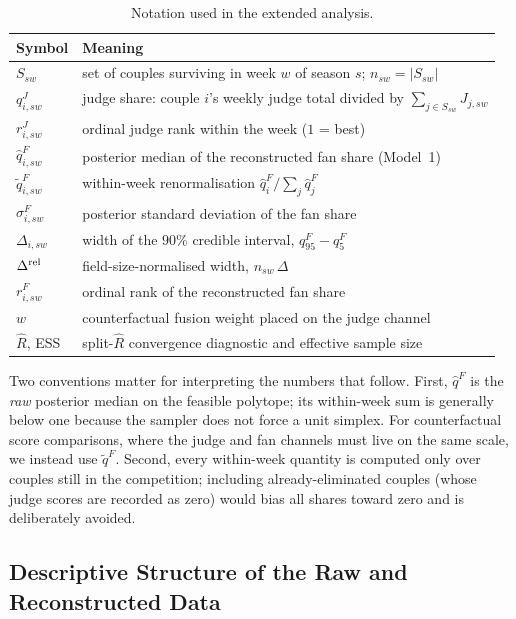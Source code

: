 \begin{table}[H]
\centering
\caption{Notation used in the extended analysis.}
\label{tab:notation}
\begin{tabular}{ll}
\toprule
Symbol & Meaning \\
\midrule
$S_{sw}$              & set of couples surviving in week $w$ of season $s$; $n_{sw}=|S_{sw}|$ \\
$q^J_{i,sw}$          & judge share: couple $i$'s weekly judge total divided by $\sum_{j\in S_{sw}}J_{j,sw}$ \\
$r^J_{i,sw}$          & ordinal judge rank within the week ($1$ = best) \\
$\hat q^F_{i,sw}$     & posterior median of the reconstructed fan share (Model~1) \\
$\tilde q^F_{i,sw}$   & within-week renormalisation $\hat q^F_i/\sum_j\hat q^F_j$ \\
$\sigma^F_{i,sw}$     & posterior standard deviation of the fan share \\
$\Delta_{i,sw}$       & width of the $90\%$ credible interval, $q^F_{95}-q^F_{5}$ \\
$\Delta^{\rm rel}$    & field-size-normalised width, $n_{sw}\,\Delta$ \\
$r^F_{i,sw}$          & ordinal rank of the reconstructed fan share \\
$w$                   & counterfactual fusion weight placed on the judge channel \\
$\hat R$, ESS         & split-$\hat R$ convergence diagnostic and effective sample size \\
\bottomrule
\end{tabular}
\end{table}

Two conventions matter for interpreting the numbers that follow. First, $\hat q^F$ is the
\emph{raw} posterior median on the feasible polytope; its within-week sum is generally below one
because the sampler does not force a unit simplex. For counterfactual score comparisons, where
the judge and fan channels must live on the same scale, we instead use $\tilde q^F$. Second,
every within-week quantity is computed only over couples still in the competition; including
already-eliminated couples (whose judge scores are recorded as zero) would bias all shares
toward zero and is deliberately avoided.

\subsection{Descriptive Structure of the Raw and Reconstructed Data}


